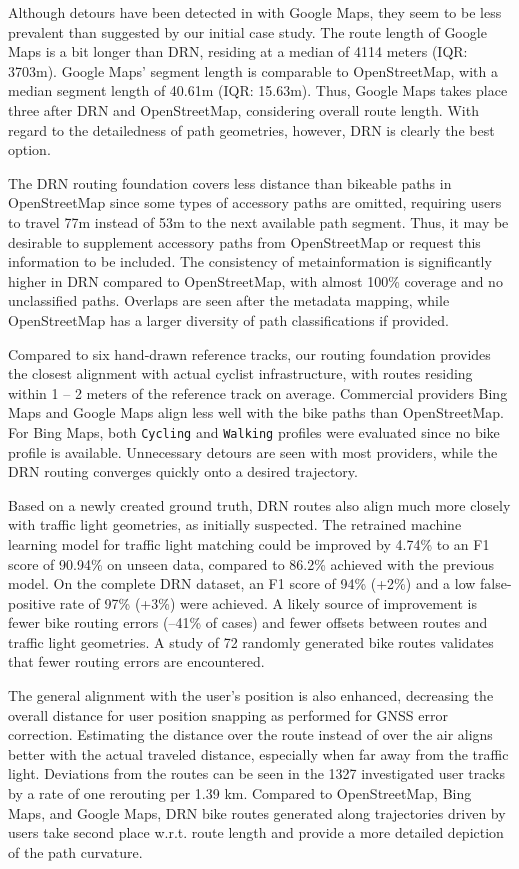 Although detours have been detected in  with Google Maps, they seem to be less prevalent than suggested by our initial case study. The route length of Google Maps is a bit longer than DRN, residing at a median of 4114 meters (IQR: 3703m). Google Maps' segment length is comparable to OpenStreetMap, with a median segment length of 40.61m (IQR: 15.63m). Thus, Google Maps takes place three after DRN and OpenStreetMap, considering overall route length. With regard to the detailedness of path geometries, however, DRN is clearly the best option.

\begin{Summary}
The DRN routing foundation covers less distance than bikeable paths in OpenStreetMap since some types of accessory paths are omitted, requiring users to travel 77m instead of 53m to the next available path segment. Thus, it may be desirable to supplement accessory paths from OpenStreetMap or request this information to be included. The consistency of metainformation is significantly higher in DRN compared to OpenStreetMap, with almost 100\% coverage and no unclassified paths. Overlaps are seen after the metadata mapping, while OpenStreetMap has a larger diversity of path classifications if provided.

Compared to six hand-drawn reference tracks, our routing foundation provides the closest alignment with actual cyclist infrastructure, with routes residing within 1 -- 2 meters of the reference track on average. Commercial providers Bing Maps and Google Maps align less well with the bike paths than OpenStreetMap. For Bing Maps, both \texttt{Cycling} and \texttt{Walking} profiles were evaluated since no bike profile is available. Unnecessary detours are seen with most providers, while the DRN routing converges quickly onto a desired trajectory. 

Based on a newly created ground truth, DRN routes also align much more closely with traffic light geometries, as initially suspected. The retrained machine learning model for traffic light matching could be improved by 4.74\% to an F1 score of 90.94\% on unseen data, compared to 86.2\% achieved with the previous model. On the complete DRN dataset, an F1 score of 94\% (+2\%) and a low false-positive rate of 97\% (+3\%) were achieved. A likely source of improvement is fewer bike routing errors (--41\% of cases) and fewer offsets between routes and traffic light geometries. A study of 72 randomly generated bike routes validates that fewer routing errors are encountered.

The general alignment with the user's position is also enhanced, decreasing the overall distance for user position snapping as performed for GNSS error correction. Estimating the distance over the route instead of over the air aligns better with the actual traveled distance, especially when far away from the traffic light. Deviations from the routes can be seen in the 1327 investigated user tracks by a rate of one rerouting per 1.39 km. Compared to OpenStreetMap, Bing Maps, and Google Maps, DRN bike routes generated along trajectories driven by users take second place w.r.t. route length and provide a more detailed depiction of the path curvature.
\end{Summary}


